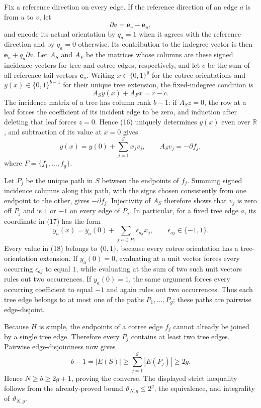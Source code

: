 Fix a reference direction on every edge.  If the reference direction of an edge \(a\) is from \(u\) to \(v\), let
\[
 \partial a=\mathbf e_v-\mathbf e_u,
\]
and encode its actual orientation by \(q_a=1\) when it agrees with the reference direction and by \(q_a=0\) otherwise.  Its contribution to the indegree vector is then \(\mathbf e_u+q_a\partial a\).  Let \(A_S\) and \(A_F\) be the matrices whose columns are these signed incidence vectors for tree and cotree edges, respectively, and let \(c\) be the sum of all reference-tail vectors \(\mathbf e_u\).  Writing \(x\in\{0,1\}^g\) for the cotree orientations and \(y(x)\in\{0,1\}^{b-1}\) for their unique tree extension, the fixed-indegree condition is
\[
 A_Sy(x)+A_Fx=r-c.
\tag{16}
\]
The incidence matrix of a tree has column rank \(b-1\): if \(A_Sz=0\), the row at a leaf forces the coefficient of its incident edge to be zero, and induction after deleting that leaf forces \(z=0\).  Hence (16) uniquely determines \(y(x)\) even over \(\mathbb R\), and subtraction of its value at \(x=0\) gives
\[
 y(x)=y(0)+\sum_{j=1}^g x_jv_j,
 \qquad A_Sv_j=-\partial f_j,
\tag{17}
\]
where \(F=\{f_1,\ldots,f_g\}\).

Let \(P_j\) be the unique path in \(S\) between the endpoints of \(f_j\).  Summing signed incidence columns along this path, with the signs chosen consistently from one endpoint to the other, gives \(-\partial f_j\).  Injectivity of \(A_S\) therefore shows that \(v_j\) is zero off \(P_j\) and is \(1\) or \(-1\) on every edge of \(P_j\).  In particular, for a fixed tree edge \(a\), its coordinate in (17) has the form
\[
 y_a(x)=y_a(0)+\sum_{j:a\in P_j}\epsilon_{aj}x_j,
 \qquad \epsilon_{aj}\in\{-1,1\}.
\tag{18}
\]
Every value in (18) belongs to \(\{0,1\}\), because every cotree orientation has a tree-orientation extension.  If \(y_a(0)=0\), evaluating at a unit vector forces every occurring \(\epsilon_{aj}\) to equal \(1\), while evaluating at the sum of two such unit vectors rules out two occurrences.  If \(y_a(0)=1\), the same argument forces every occurring coefficient to equal \(-1\) and again rules out two occurrences.  Thus each tree edge belongs to at most one of the paths \(P_1,\ldots,P_g\); these paths are pairwise edge-disjoint.

Because \(H\) is simple, the endpoints of a cotree edge \(f_j\) cannot already be joined by a single tree edge.  Therefore every \(P_j\) contains at least two tree edges.  Pairwise edge-disjointness now gives
\[
 b-1=|E(S)|
 \geq\sum_{j=1}^g|E(P_j)|
 \geq2g.
\tag{19}
\]
Hence \(N\geq b\geq2g+1\), proving the converse.  The displayed strict inequality follows from the already-proved bound \(\vartheta_{N,g}\leq2^g\), the equivalence, and integrality of \(\vartheta_{N,g}\).
